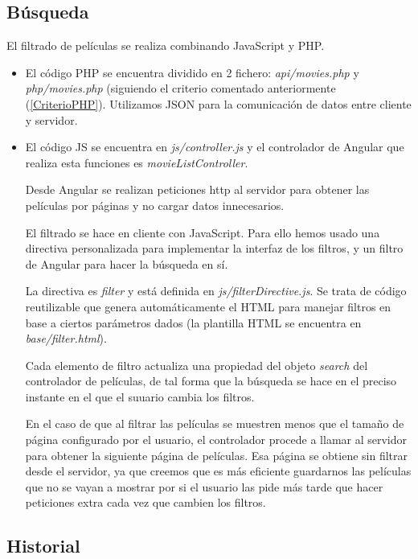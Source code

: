 \documentclass{apuntes}
\begin{document}
\subsection{Búsqueda}
El filtrado de películas se realiza combinando JavaScript y PHP. 

\begin{itemize}
\item El código PHP se encuentra dividido en 2 fichero: \textit{api/movies.php} y \textit{php/movies.php} (siguiendo el criterio comentado anteriormente (\ref{CriterioPHP}). Utilizamos JSON para la comunicación de datos entre cliente y servidor.

\item El código JS se encuentra en \textit{js/controller.js} y el controlador de Angular que realiza esta funciones es \textit{movieListController}.

Desde Angular se realizan peticiones http al servidor para obtener las películas por páginas y no cargar datos innecesarios.

El filtrado se hace en cliente con JavaScript. Para ello hemos usado una directiva personalizada para implementar la interfaz de los filtros, y un filtro de Angular para hacer la búsqueda en sí.

La directiva es \textit{filter} y está definida en \textit{js/filterDirective.js}. Se trata de código reutilizable que genera automáticamente el HTML para manejar filtros en base a ciertos parámetros dados (la plantilla HTML se encuentra en \textit{base/filter.html}).

Cada elemento de filtro actualiza una propiedad del objeto \textit{search} del controlador de películas, de tal forma que la búsqueda se hace en el preciso instante en el que el suuario cambia los filtros.

En el caso de que al filtrar las películas se muestren menos que el tamaño de página configurado por el usuario, el controlador procede a llamar al servidor para obtener la siguiente página de películas. Esa página se obtiene sin filtrar desde el servidor, ya que creemos que es más eficiente guardarnos las películas que no se vayan a mostrar por si el usuario las pide más tarde que hacer peticiones extra cada vez que cambien los filtros.
\end{itemize}



\subsection{Historial}
\end{document}
